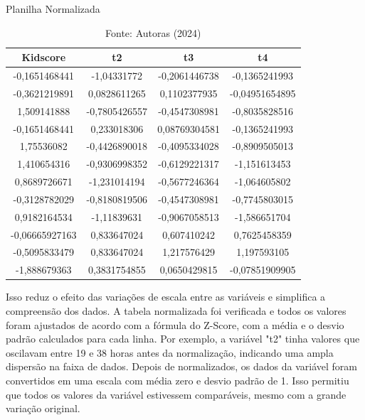 \begin{table}[h!]
  \centering
  \renewcommand{\arraystretch}{1.2} 
  \captionsetup{font=footnotesize, justification=centering, labelsep=period, position=above}
  \caption{Planilha Normalizada}
  \label{tab:normalizacao}
  \begin{tabular}{|c|c|c|c|}
      \vspace{0.2cm} \cellcolor[HTML]{008940}  \textbf{Kidscore} & \cellcolor[HTML]{008940} \textbf{t2} & \cellcolor[HTML]{008940}  \textbf{t3} & \cellcolor[HTML]{008940}  \textbf{t4} \\
      
      \hline
      -0,1651468441 & -1,04331772 & -0,2061446738 & -0,1365241993 \\
      -0,3621219891 & 0,0828611265 & 0,1102377935 & -0,04951654895 \\
      1,509141888 & -0,7805426557 & -0,4547308981 & -0,8035828516 \\
      -0,1651468441 & 0,233018306 & 0,08769304581 & -0,1365241993 \\
      1,75536082 & -0,4426890018 & -0,4095334028 & -0,8909505013 \\
      1,410654316 & -0,9306998352 & -0,6129221317 & -1,151613453 \\
      0,8689726671 & -1,231014194 & -0,5677246364 & -1,064605802 \\
      -0,3128782029 & -0,8180819506 & -0,4547308981 & -0,7745803015 \\
      0,9182164534 & -1,11839631 & -0,9067058513 & -1,586651704 \\
      -0,06665927163 & 0,833647024 & 0,607410242 & 0,7625458359 \\
      -0,5095833479 & 0,833647024 & 1,217576429 & 1,197593105 \\
      -1,888679363 & 0,3831754855 & 0,0650429815 & -0,07851909905 \\
      \hline
  \end{tabular}
  \caption*{\scriptsize Fonte: Autoras (2024)}
\end{table}
\FloatBarrier

Isso reduz o efeito das variações de escala entre as variáveis e simplifica a compreensão dos dados. A tabela normalizada foi verificada e todos os valores foram ajustados de acordo com a fórmula do Z-Score, com a média e o desvio padrão calculados para cada linha. Por exemplo, a variável "t2" tinha valores que oscilavam entre 19 e 38 horas antes da normalização, indicando uma ampla dispersão na faixa de dados. Depois de normalizados, os dados da variável foram convertidos em uma escala com média zero e desvio padrão de 1. Isso permitiu que todos os valores da variável estivessem comparáveis, mesmo com a grande variação original.

